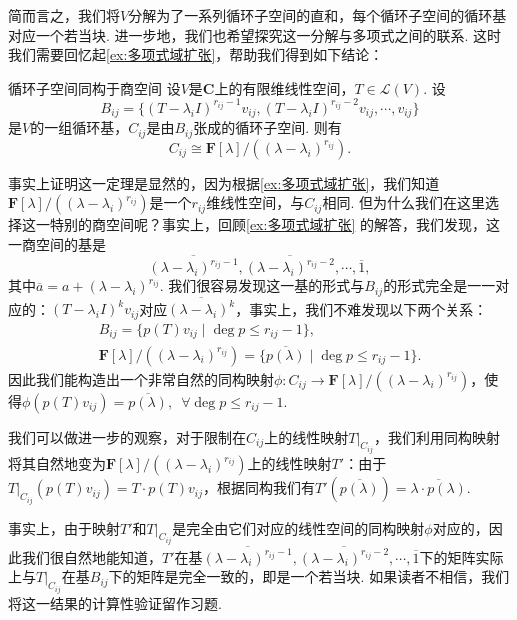 简而言之，我们将$V$分解为了一系列循环子空间的直和，每个循环子空间的循环基对应一个若当块. 进一步地，我们也希望探究这一分解与多项式之间的联系. 这时我们需要回忆起\autoref{ex:多项式域扩张}，帮助我们得到如下结论：
\begin{theorem}{}{循环子空间同构于商空间}
    设$V$是$\mathbf{C}$上的有限维线性空间，$T\in\mathcal{L}(V)$. 设
    \[B_{ij}=\{(T-\lambda_iI)^{r_{ij}-1}v_{ij},(T-\lambda_iI)^{r_{ij}-2}v_{ij},\cdots,v_{ij}\}\]
    是$V$的一组循环基，$C_{ij}$是由$B_{ij}$张成的循环子空间. 则有
    \[C_{ij}\cong \mathbf{F}[\lambda]/((\lambda-\lambda_i)^{r_{ij}}).\]
\end{theorem}

事实上证明这一定理是显然的，因为根据\autoref{ex:多项式域扩张}，我们知道$\mathbf{F}[\lambda]/((\lambda-\lambda_i)^{r_{ij}})$是一个$r_{ij}$维线性空间，与$C_{ij}$相同. 但为什么我们在这里选择这一特别的商空间呢？事实上，回顾\autoref{ex:多项式域扩张} 的解答，我们发现，这一商空间的基是
\[\overline{(\lambda-\lambda_i)^{r_{ij}-1}},\overline{(\lambda-\lambda_i)^{r_{ij}-2}},\cdots,\overline{1},\]
其中$\overline{a}=a+(\lambda-\lambda_i)^{r_{ij}}$. 我们很容易发现这一基的形式与$B_{ij}$的形式完全是一一对应的：$(T-\lambda_iI)^kv_{ij}$对应$\overline{(\lambda-\lambda_i)^k}$，事实上，我们不难发现以下两个关系：
\begin{gather*}
    B_{ij}=\{p(T)v_{ij}\mid \deg p\leqslant r_{ij}-1\},\\
    \mathbf{F}[\lambda]/((\lambda-\lambda_i)^{r_{ij}})=\{\overline{p(\lambda)}\mid \deg p\leqslant r_{ij}-1\}.
\end{gather*}
因此我们能构造出一个非常自然的同构映射$\phi:C_{ij}\to \mathbf{F}[\lambda]/((\lambda-\lambda_i)^{r_{ij}})$，使得$\phi(p(T)v_{ij})=\overline{p(\lambda)},\enspace\forall \deg p\leqslant r_{ij}-1$.

我们可以做进一步的观察，对于限制在$C_{ij}$上的线性映射$T|_{C_{ij}}$，我们利用同构映射将其自然地变为$\mathbf{F}[\lambda]/((\lambda-\lambda_i)^{r_{ij}})$上的线性映射$T'$：由于$T|_{C_{ij}}(p(T)v_{ij})=T\cdot p(T)v_{ij}$，根据同构我们有$T'(\overline{p(\lambda)})=\overline{\lambda\cdot p(\lambda)}$.

事实上，由于映射$T'$和$T|_{C_{ij}}$是完全由它们对应的线性空间的同构映射$\phi$对应的，因此我们很自然地能知道，$T'$在基$\overline{(\lambda-\lambda_i)^{r_{ij}-1}},\overline{(\lambda-\lambda_i)^{r_{ij}-2}},\cdots,\overline{1}$下的矩阵实际上与$T|_{C_{ij}}$在基$B_{ij}$下的矩阵是完全一致的，即是一个若当块. 如果读者不相信，我们将这一结果的计算性验证留作习题.

